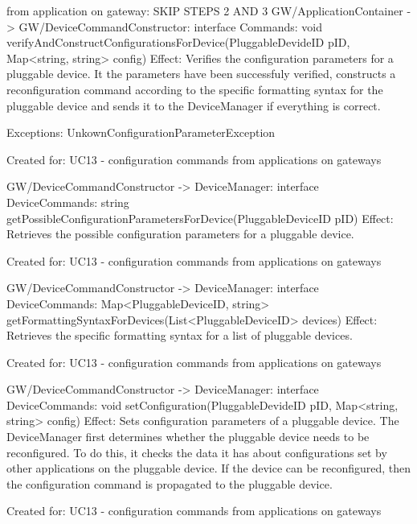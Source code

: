                 from application on gateway: SKIP STEPS 2 AND 3
                    GW/ApplicationContainer -> GW/DeviceCommandConstructor: interface Commands: void verifyAndConstructConfigurationsForDevice(PluggableDevideID pID, Map<string, string> config)
                        Effect: Verifies the configuration parameters for a pluggable device. It the parameters have been successfuly verified,
                                constructs a reconfiguration command according to the specific formatting syntax for the pluggable device and sends it to the DeviceManager if everything is correct.
                        \item Exceptions: UnkownConfigurationParameterException
                        \item Created for: UC13 - configuration commands from applications on gateways

                    GW/DeviceCommandConstructor -> DeviceManager: interface DeviceCommands: string getPossibleConfigurationParametersForDevice(PluggableDeviceID pID)
                        Effect: Retrieves the possible configuration parameters for a pluggable device.
                        \item Created for: UC13 - configuration commands from applications on gateways

                    GW/DeviceCommandConstructor -> DeviceManager: interface DeviceCommands: Map<PluggableDeviceID, string> getFormattingSyntaxForDevices(List<PluggableDeviceID> devices)
                        Effect: Retrieves the specific formatting syntax for a list of pluggable devices.
                        \item Created for: UC13 - configuration commands from applications on gateways

                    GW/DeviceCommandConstructor -> DeviceManager: interface DeviceCommands: void setConfiguration(PluggableDevideID pID, Map<string, string> config)
                        Effect: Sets configuration parameters of a pluggable device. The DeviceManager first determines whether the pluggable device needs to be reconfigured. To do this,
                                it checks the data it has about configurations set by other applications on the pluggable device. If the device can be reconfigured, then the configuration
                                command is propagated to the pluggable device.
                        \item Created for: UC13 - configuration commands from applications on gateways


